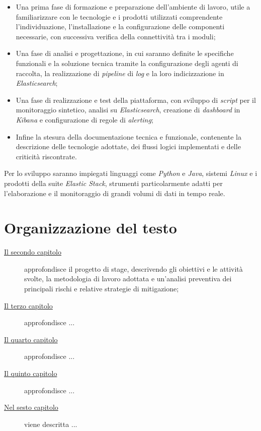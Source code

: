 \begin{itemize}
    \item Una prima fase di formazione e preparazione dell'ambiente di lavoro, utile a familiarizzare con le tecnologie e i prodotti utilizzati comprendente l'individuazione, l'installazione e la configurazione delle componenti necessarie, con successiva verifica della connettività tra i moduli;
    \item Una fase di analisi e progettazione, in cui saranno definite le specifiche funzionali e la soluzione tecnica tramite la configurazione degli agenti di raccolta, la realizzazione di \emph{pipeline} di \emph{log} e la loro indicizzazione in \emph{Elasticsearch};
    \item Una fase di realizzazione e test della piattaforma, con sviluppo di \emph{script} per il monitoraggio sintetico, analisi su \emph{Elasticsearch}, creazione di \emph{dashboard} in \emph{Kibana} e configurazione di regole di \emph{alerting};
    \item Infine la stesura della documentazione tecnica e funzionale, contenente la descrizione delle tecnologie adottate, dei flussi logici implementati e delle criticità riscontrate.
\end{itemize}

Per lo sviluppo saranno impiegati linguaggi come \emph{Python} e \emph{Java}, sistemi \emph{Linux} e i prodotti della suite \emph{Elastic Stack}, strumenti particolarmente adatti per l'elaborazione e il monitoraggio di grandi volumi di dati in tempo reale.


\section{Organizzazione del testo}

\begin{description}
    \item[{\hyperref[cap:descrizione-stage]{Il secondo capitolo}}] approfondisce il progetto di stage, descrivendo gli obiettivi e le attività svolte, la metodologia di lavoro adottata e un'analisi preventiva dei principali rischi e relative strategie di mitigazione;
    
    \item[{\hyperref[cap:analisi-requisiti]{Il terzo capitolo}}] approfondisce ...
    
    \item[{\hyperref[cap:progettazione-codifica]{Il quarto capitolo}}] approfondisce ...
    
    \item[{\hyperref[cap:verifica-validazione]{Il quinto capitolo}}] approfondisce ...
    
    \item[{\hyperref[cap:conclusioni]{Nel sesto capitolo}}] viene descritta ...
\end{description}

